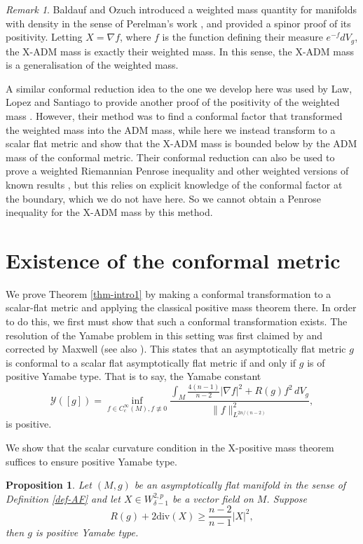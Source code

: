 \documentclass[a4paper,11pt,reqno]{amsart}
\theoremstyle{plain}
\newtheorem{prop}[thm]{Proposition}
\theoremstyle{definition}
\theoremstyle{remark}
\newtheorem{rem}[thm]{Remark}
\numberwithin{equation}{section}
\begin{document}
\begin{rem}
	Baldauf and Ozuch introduced a weighted mass quantity for manifolds with density \cite{BaldaufOzuch22} in the sense of Perelman's work \cite{perelman2002entropy}, and provided a spinor proof of its positivity.	Letting $X=\nabla f$, where $f$ is the function defining their measure $e^{-f}dV_g$, the X-ADM mass is exactly their weighted mass. In this sense, the X-ADM mass is a generalisation of the weighted mass.
		
		A similar conformal reduction idea to the one we develop here was used by Law, Lopez and Santiago to provide another proof of the positivity of the weighted mass \cite{LawLopezSantiago2025WeightedMass}. However, their method was to find a conformal factor that transformed the weighted mass into the ADM mass, while here we instead transform to a scalar flat metric and show that the X-ADM mass is bounded below by the ADM mass of the conformal metric. Their conformal reduction can also be used to prove a weighted Riemannian Penrose inequality and other weighted versions of known results \cite{MeWeighted}, but this relies on explicit knowledge of the conformal factor at the boundary, which we do not have here. So we cannot obtain a Penrose inequality for the X-ADM mass by this method.
\end{rem}

\section{Existence of the conformal metric}

We prove Theorem \ref{thm-intro1} by making a conformal transformation to a scalar-flat metric and applying the classical positive mass theorem there. In order to do this, we first must show that such a conformal transformation exists. The resolution of the Yamabe problem in this setting was first claimed by \cite{CantorBrill1981Laplacian} and corrected by Maxwell \cite{Maxwell2005ApparentHorizonBoundaries} (see also \cite{DiltsMaxwell2018YamabeAE}). This states that an asymptotically flat metric $g$ is conformal to a scalar flat asymptotically flat metric if and only if $g$ is of positive Yamabe type. That is to say, the Yamabe constant
\begin{equation}
	\mathcal Y([g])=\inf_{f\in C^\infty_c(M),f\not\equiv0}\frac{\int_M \frac{4(n-1)}{n-2}|\nabla f|^2+R(g)f^2\,dV_g}{\|f\|^2_{L^{2n/(n-2)}}},
\end{equation}
is positive. 

We show that the scalar curvature condition in the X-positive mass theorem suffices to ensure positive Yamabe type.
\begin{prop}\label{prop-Yamabe}
	Let $(M,g)$ be an asymptotically flat manifold in the sense of Definition \ref{def-AF} and let $X\in W^{2,p}_{\delta-1}$ be a vector field on $M$. Suppose
	\begin{equation}
		R(g)+ 2\mathrm{div}(X)\geq\frac{n-2}{n-1}|X|^2,
	\end{equation}
	then $g$ is positive Yamabe type.
\end{prop}
\end{document}
